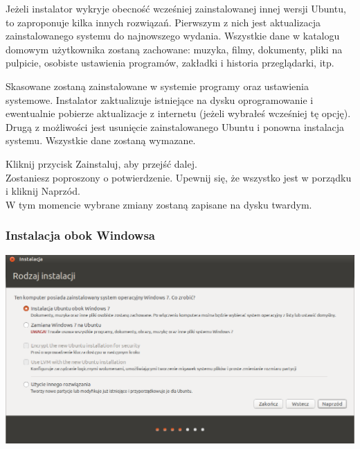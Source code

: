 Jeżeli instalator wykryje obecność wcześniej zainstalowanej innej wersji Ubuntu, to zaproponuje kilka innych rozwiązań.
Pierwszym z nich jest aktualizacja zainstalowanego systemu do najnowszego wydania. Wszystkie dane w katalogu domowym użytkownika zostaną zachowane: muzyka, filmy, dokumenty, pliki na pulpicie, osobiste ustawienia programów, zakładki i historia przeglądarki, itp.

Skasowane zostaną zainstalowane w systemie programy oraz ustawienia systemowe. Instalator zaktualizuje istniejące na dysku oprogramowanie i ewentualnie pobierze aktualizacje z internetu (jeżeli wybrałeś wcześniej tę opcję).
Drugą z możliwości jest usunięcie zainstalowanego Ubuntu i ponowna instalacja systemu. Wszystkie dane zostaną wymazane.
\begin{flushright}
Kliknij przycisk \textcolor{ubuntu_orange}{Zainstaluj}, aby przejść dalej.\\
Zostaniesz poproszony o potwierdzenie. Upewnij się, że wszystko jest w porządku i kliknij \textcolor{ubuntu_orange}{Naprzód}.\\
W tym momencie wybrane zmiany zostaną zapisane na dysku twardym.
\end{flushright}
\clearpage
\subsubsection{Instalacja obok Windowsa}
\begin{center}
        \includegraphics[width=\linewidth]{images/instalator_partycjonowanie_obok_wondows7.png}
\end{center}

